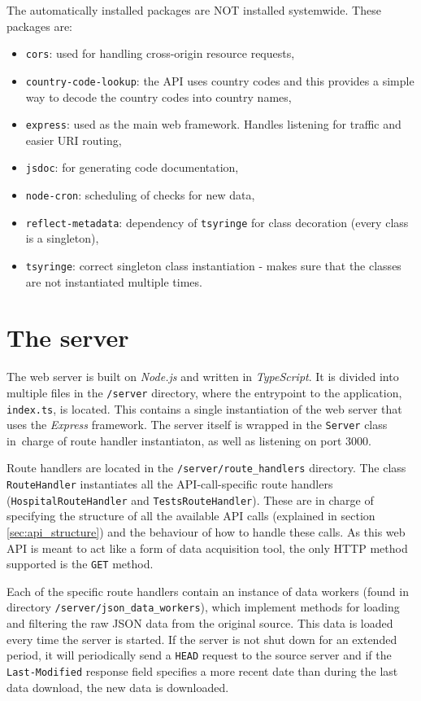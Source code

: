 \documentclass[pdftex, 11pt, a4paper]{article}
\newcommand{\code}{\texttt}
\begin{document}
    The automatically installed packages are NOT installed systemwide. These packages are:
    \begin{itemize}
        \item \code{cors}: used for handling cross-origin resource requests,
        \item \code{country-code-lookup}: the API uses country codes and this provides a simple
            way to decode the country codes into country names,
        \item \code{express}: used as the main web framework. Handles listening for traffic and
            easier URI routing,
        \item \code{jsdoc}: for generating code documentation,
        \item \code{node-cron}: scheduling of checks for new data,
        \item \code{reflect-metadata}: dependency of \code{tsyringe} for class decoration (every class
            is a singleton),
        \item \code{tsyringe}: correct singleton class instantiation - makes sure
            that the classes are not instantiated multiple times.
    \end{itemize}

    \section{The server}
    The web server is built on \emph{Node.js} and written in \emph{TypeScript}.
    It is divided into multiple files in the \code{/server} directory, where
    the entrypoint to the application, \code{index.ts}, is located. This contains
    a single instantiation of the web server that uses the \emph{Express} framework.
    The server itself is wrapped in the \code{Server} class in~charge of route handler
    instantiaton, as well as listening on port 3000.

    Route handlers are located in the \code{/server/route\_handlers} directory.
    The class \code{RouteHandler} instantiates all the API-call-specific route handlers
    (\code{HospitalRouteHandler} and \code{TestsRouteHandler}). These are in charge of
    specifying the structure of all the available API calls (explained in section
    \ref{sec:api_structure}) and the behaviour of how to handle these calls. As this web
    API is meant to act like a form of data acquisition tool, the only HTTP method
    supported is the \code{GET} method.

    Each of the specific route handlers contain an instance of data workers
    (found in directory \newline \code{/server/json\_data\_workers}), which implement methods for
    loading and filtering the raw JSON data from the original source. This data is loaded
    every time the server is started. If the server is not shut down for an extended period,
    it will periodically send a \code{HEAD} request to the source server and if the
    \code{Last-Modified} response field specifies a more recent date than during
    the last data download, the new data is downloaded.
\end{document}
